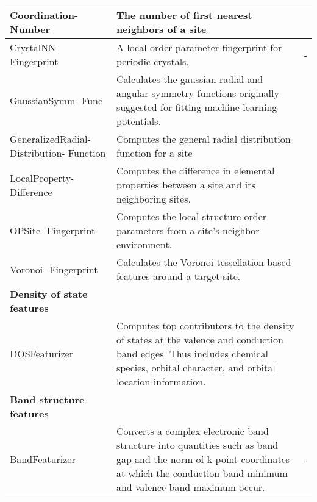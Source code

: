 \begin{center}
\begin{longtable}{M{3.5cm} M{6.5cm} M{2.0cm}}
  Coordination- Number & The number of first nearest neighbors of a site & \cite{Zimmermann2017}  \\ \hline
  CrystalNN- Fingerprint & A local order parameter fingerprint for periodic crystals. & -  \\ \hline
  GaussianSymm- Func & Calculates the gaussian radial and angular symmetry functions originally suggested for fitting machine learning potentials. & \cite{Behler2011,Khorshidi2016}  \\ \hline
  GeneralizedRadial- Distribution- Function & Computes the general radial distribution function for a site & \cite{Seko2017}  \\ \hline
  LocalProperty- Difference & Computes the difference in elemental properties between a site and its neighboring sites. & \cite{Ward2017, Jong2016} \\ \hline
  OPSite- Fingerprint & Computes the local structure order parameters from a site's neighbor environment. & \cite{Zimmermann2017} \\ \hline
  Voronoi- Fingerprint & Calculates the Voronoi tessellation-based features around a target site. & \cite{Peng2011,Wang2019} \\
  \hline
  \textbf{Density of state features} & & \\
  \hline
  DOSFeaturizer & Computes top contributors to the density of states at the valence and conduction band edges. Thus includes chemical species, orbital character, and orbital location information. & \cite{Dylla2020} \\
  \hline
  \textbf{Band structure features} & & \\
  \hline
  BandFeaturizer & Converts a complex electronic band structure into quantities such as band gap and the norm of k point coordinates at which the conduction band minimum and valence band maximum occur. & - \\
  \hline
\end{longtable}
\end{center}
